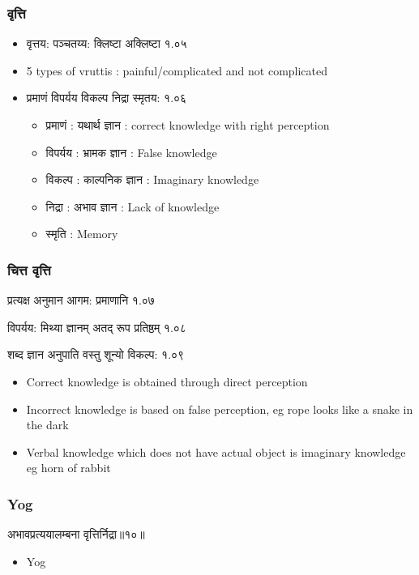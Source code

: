 \begin{frame}[fragile]\frametitle{वृत्ति}

	\begin{itemize}
	\item वृत्तय: पञ्चतय्य: क्लिष्टा अक्लिष्टा १.०५
	\item 5 types of vruttis : painful/complicated and not complicated
	\item प्रमाणं विपर्यय विकल्प निद्रा स्मृतय: १.०६
		\begin{itemize}
		\item प्रमाणं : यथार्थ ज्ञान : correct knowledge with right perception
		\item विपर्यय : भ्रामक ज्ञान : False knowledge
		\item विकल्प : काल्पनिक ज्ञान : Imaginary knowledge
		\item निद्रा : अभाव ज्ञान : Lack of knowledge
		\item स्मृति : Memory
		
		\end{itemize}	
	\end{itemize}

\end{frame}

\begin{frame}[fragile]\frametitle{चित्त वृत्ति}

\begin{sanskrit}
प्रत्यक्ष अनुमान आगम: प्रमाणानि १.०७

विपर्यय: मिथ्या ज्ञानम् अतद् रूप प्रतिष्ठम् १.०८

शब्द ज्ञान अनुपाति वस्तु शून्यो विकल्प: १.०९
\end{sanskrit}


	\begin{itemize}
	\item Correct knowledge is obtained through direct perception
	\item Incorrect knowledge is based on false perception, eg rope looks like a snake in the dark
	\item Verbal knowledge which does not have actual object is imaginary knowledge eg horn of rabbit
	\end{itemize}

\end{frame}

\begin{frame}[fragile]\frametitle{Yog}
\begin{sanskrit}
अभावप्रत्ययालम्बना वृत्तिर्निद्रा॥१०॥
\end{sanskrit}
	\begin{itemize}
	\item Yog 
	\end{itemize}
\end{frame}



